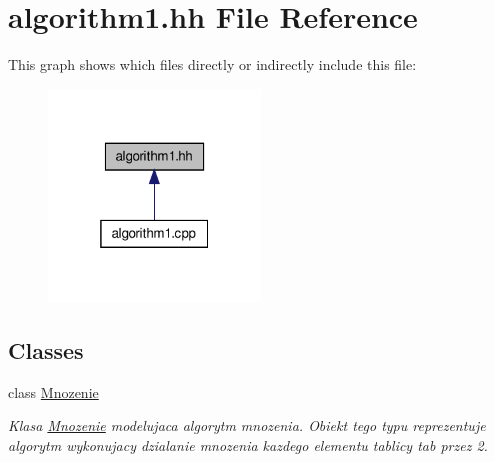 \hypertarget{algorithm1_8hh}{\section{algorithm1.\-hh File Reference}
\label{algorithm1_8hh}
}
This graph shows which files directly or indirectly include this file\-:\nopagebreak
\begin{figure}[H]
\begin{center}
\leavevmode
\includegraphics[width=160pt]{algorithm1_8hh__dep__incl}
\end{center}
\end{figure}
\subsection*{Classes}
\begin{DoxyCompactItemize}
\item 
class \hyperlink{class_mnozenie}{Mnozenie}
\begin{DoxyCompactList}\small\item\em Klasa \hyperlink{class_mnozenie}{Mnozenie} modelujaca algorytm mnozenia. Obiekt tego typu reprezentuje algorytm wykonujacy dzialanie mnozenia kazdego elementu tablicy tab przez 2. \end{DoxyCompactList}\end{DoxyCompactItemize}

